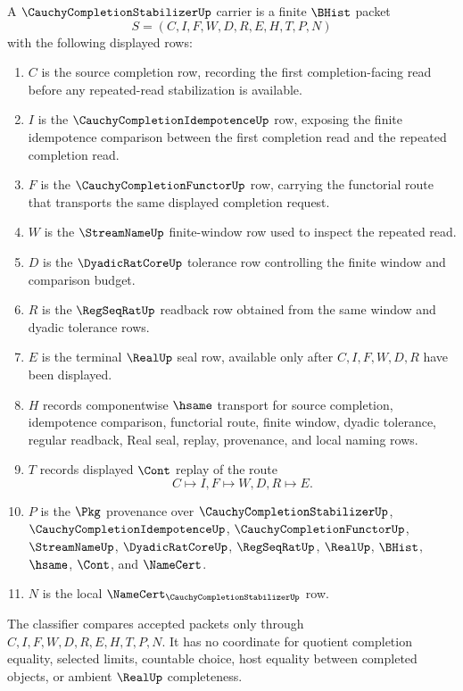 \begin{definition}
\label{def:cauchy-completion-stabilizer-carrier}
A $\CauchyCompletionStabilizerUp$ carrier is a finite $\BHist$ packet
$$
S=(C,I,F,W,D,R,E,H,T,P,N)
$$
with the following displayed rows:
\begin{enumerate}
\item $C$ is the source completion row, recording the first completion-facing read before any repeated-read stabilization is available.
\item $I$ is the $\CauchyCompletionIdempotenceUp$ row, exposing the finite idempotence comparison between the first completion read and the repeated completion read.
\item $F$ is the $\CauchyCompletionFunctorUp$ row, carrying the functorial route that transports the same displayed completion request.
\item $W$ is the $\StreamNameUp$ finite-window row used to inspect the repeated read.
\item $D$ is the $\DyadicRatCoreUp$ tolerance row controlling the finite window and comparison budget.
\item $R$ is the $\RegSeqRatUp$ readback row obtained from the same window and dyadic tolerance rows.
\item $E$ is the terminal $\RealUp$ seal row, available only after $C,I,F,W,D,R$ have been displayed.
\item $H$ records componentwise $\hsame$ transport for source completion, idempotence comparison, functorial route, finite window, dyadic tolerance, regular readback, Real seal, replay, provenance, and local naming rows.
\item $T$ records displayed $\Cont$ replay of the route
$$
C \longmapsto I,F \longmapsto W,D,R \longmapsto E .
$$
\item $P$ is the $\Pkg$ provenance over $\CauchyCompletionStabilizerUp$, $\CauchyCompletionIdempotenceUp$, $\CauchyCompletionFunctorUp$, $\StreamNameUp$, $\DyadicRatCoreUp$, $\RegSeqRatUp$, $\RealUp$, $\BHist$, $\hsame$, $\Cont$, and $\NameCert$.
\item $N$ is the local $\NameCert_{\CauchyCompletionStabilizerUp}$ row.
\end{enumerate}
The classifier compares accepted packets only through $C,I,F,W,D,R,E,H,T,P,N$. It has no coordinate for quotient completion equality, selected limits, countable choice, host equality between completed objects, or ambient $\RealUp$ completeness.
\end{definition}

